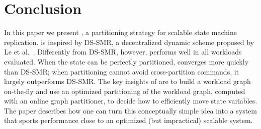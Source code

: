 \section{Conclusion}
\label{sec:conclusion}

In this paper we present \dynastar, a partitioning strategy for scalable state machine replication.
\dynastar is inspired by DS-SMR, a decentralized dynamic scheme proposed by Le et al.~\cite{hoang2016}.
Differently from DS-SMR, however, \dynastar performs well in all workloads evaluated.
When the state can be perfectly partitioned, \dynastar converges more quickly than DS-SMR; when partitioning cannot avoid cross-partition commands, it largely outperforms DS-SMR.
The key insights of \dynastar are to build a workload graph on-the-fly and use an optimized partitioning of the workload graph, computed with an online graph partitioner, to decide how to efficiently move state variables.
The paper describes how one can turn this conceptually simple idea into a system that sports performance close to an optimized (but impractical) scalable system.
